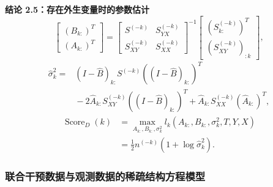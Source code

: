 \par\medskip\noindent\textbf{结论 2.5：存在外生变量时的参数估计}\quad
\begin{equation}
\begin{bmatrix}(B_{k:})^T\\(A_{k:})^T\end{bmatrix}
=
\begin{bmatrix}
S^{(-k)}&S_{YX}^{(-k)}\\
S_{XY}^{(-k)}&S_{XX}^{(-k)}
\end{bmatrix}^{-1}
\begin{bmatrix}
(S_{k:}^{(-k)})^T\\(S_{XY}^{(-k)})_{:k}
\end{bmatrix},
\tag{2.133}
\end{equation}
\begin{equation}
\begin{aligned}
\widehat\sigma_k^2
={}&(I-\widehat B)_{k:}S^{(-k)}
\left((I-\widehat B)_{k:}\right)^T\\
&{}-2\widehat A_{k:}S_{XY}^{(-k)}
\left((I-\widehat B)_{k:}\right)^T
+\widehat A_{k:}S_{XX}^{(-k)}(\widehat A_{k:})^T,
\end{aligned}\tag{2.134}
\end{equation}
\begin{equation}
\begin{aligned}
\operatorname{Score}_D(k)
&=\max_{A_{k:},B_{k:},\sigma_k^2}
l_k(A_{k:},B_{k:},\sigma_k^2,T,Y,X)\\
&=\frac12n^{(-k)}(1+\log\widehat\sigma_k^2).
\end{aligned}\tag{2.135}
\end{equation}

\subsubsection{联合干预数据与观测数据的稀疏结构方程模型}

